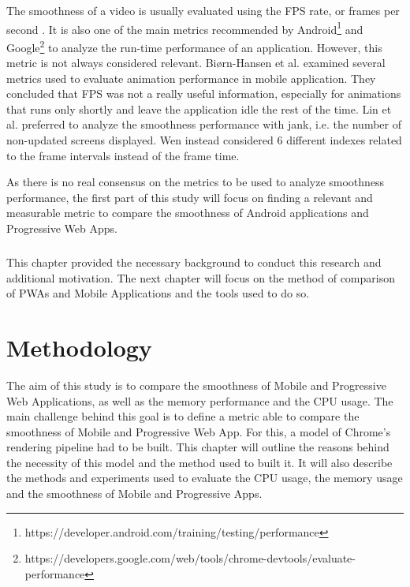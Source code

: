 \documentclass{kththesis}
\begin{document}
The smoothness of a video is usually evaluated using the FPS rate, or frames per second \cite{smooth_gui}. It is also one of the main metrics recommended by Android\footnote{https://developer.android.com/training/testing/performance} and Google\footnote{https://developers.google.com/web/tools/chrome-devtools/evaluate-performance} to analyze the run-time performance of an application.\newline
However, this metric is not always considered relevant. Biørn-Hansen et al. \cite{animation_performance} examined several metrics used to evaluate animation performance in mobile application. They concluded that FPS was not a really useful information, especially for animations that runs only shortly and leave the application idle the rest of the time. Lin et al.\cite{smooth_gui} preferred to 
analyze the smoothness performance with jank, i.e. the number of non-updated screens displayed. Wen \cite{smoothnessQoE} instead considered 6 different indexes related to the frame intervals instead of the frame time. 

As there is no real consensus on the metrics to be used to analyze smoothness performance,  the first part of this study will focus on finding a relevant and measurable metric to compare the smoothness of Android applications and Progressive Web Apps.

\paragraph{}
This chapter provided the necessary background to conduct this research and additional motivation. The next chapter will focus on the method of comparison of PWAs and Mobile Applications and the tools used to do so.
    

\chapter{Methodology}


The aim of this study is to compare the smoothness of Mobile and Progressive Web Applications, as well as the memory performance and the CPU usage. The main challenge behind this goal is to define a metric able to compare the smoothness of Mobile and Progressive Web App. For this, a model of Chrome's rendering pipeline had to be built. This chapter will outline the reasons behind the necessity of this model and the method used to built it. It will also describe the methods and experiments used to evaluate the CPU usage, the memory usage and the smoothness of Mobile and Progressive Apps.
\end{document}
